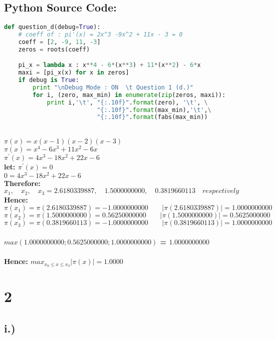 \documentclass{article}
\begin{document}
\subsection*{Python Source Code:}
\begin{lstlisting}[language=Python]
def question_d(debug=True):
    # coeff of : pi'(x) = 2x^3 -9x^2 + 11x - 3 = 0
    coeff = [2, -9, 11, -3]
    zeros = roots(coeff)

    pi_x = lambda x : x**4 - 6*(x**3) + 11*(x**2) - 6*x
    maxi = [pi_x(x) for x in zeros]
    if debug is True:
        print "\nDebug Mode : ON  \t Question 1 (d.)"
        for i, (zero, max_min) in enumerate(zip(zeros, maxi)):
            print i,'\t', "{:.10f}".format(zero), '\t', \
                          "{:.10f}".format(max_min),'\t',\
                          "{:.10f}".format(fabs(max_min))
\end{lstlisting}
\textbf{  \\  }
\textbf{$\pi(x) = x(x - 1)(x - 2)(x - 3)$\\
$\pi(x) = x^4 - 6x^3 + 11x^2 - 6x $\\
$\pi^' (x) = 4x^3 - 18x^2 + 22x - 6 $\\
let: $\pi^' (x) = 0$ \\
$ 0 = 4x^3 - 18x^2 + 22x - 6$\\
Therefore:\\
$x_1, \quad x_2, \quad x_3 = 2.6180339887,\quad 1.5000000000,\quad 0.3819660113 \quad respectively$ \\
Hence: \\
$\pi(x_1) = \pi(2.6180339887) = -1.0000000000  \quad\quad|\pi(2.6180339887)| = 1.0000000000$\\
$\pi(x_2) = \pi(1.5000000000) = 0.56250000000 \quad\quad|\pi(1.5000000000)| = 0.5625000000$ \\
$\pi(x_3) = \pi(0.3819660113) = -1.0000000000  \quad\quad|\pi(0.3819660113)| = 1.0000000000$\\\\
$max(1.0000000000; 0.5625000000; 1.0000000000)$ = $1.0000000000$\\\\
Hence: $ max_{x_0 \leq x \leq x_3} |\pi(x)| = 1.0000$ 
}
\pagebreak
\section*{2}
\subsection*{i.)}
\end{document}
